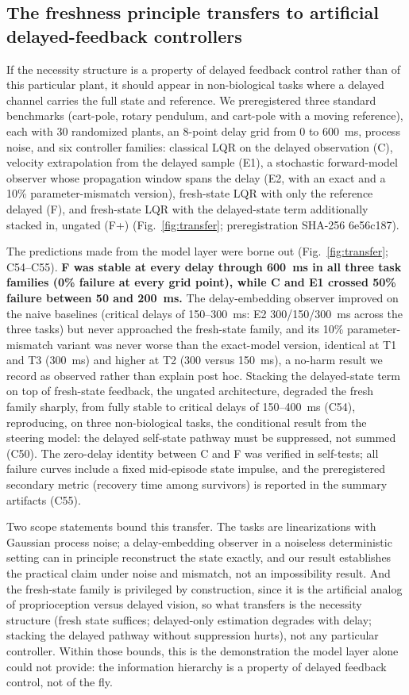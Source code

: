 \documentclass[pdflatex,sn-nature]{sn-jnl}
\begin{document}
\subsection{The freshness principle transfers to artificial delayed-feedback controllers}

If the necessity structure is a property of delayed feedback control rather than of this particular plant, it should appear in non-biological tasks where a delayed channel carries the full state and reference. We preregistered three standard benchmarks (cart-pole, rotary pendulum, and cart-pole with a moving reference), each with 30 randomized plants, an 8-point delay grid from 0 to 600~ms, process noise, and six controller families: classical LQR on the delayed observation (C), velocity extrapolation from the delayed sample (E1), a stochastic forward-model observer whose propagation window spans the delay (E2, with an exact and a 10\% parameter-mismatch version), fresh-state LQR with only the reference delayed (F), and fresh-state LQR with the delayed-state term additionally stacked in, ungated (F+) (Fig.~\ref{fig:transfer}; preregistration SHA-256 6e56c187).

The predictions made from the model layer were borne out (Fig.~\ref{fig:transfer}; C54--C55). \textbf{F was stable at every delay through 600~ms in all three task families (0\% failure at every grid point), while C and E1 crossed 50\% failure between 50 and 200~ms.} The delay-embedding observer improved on the naive baselines (critical delays of 150--300~ms: E2 300/150/300~ms across the three tasks) but never approached the fresh-state family, and its 10\% parameter-mismatch variant was never worse than the exact-model version, identical at T1 and T3 (300~ms) and higher at T2 (300 versus 150~ms), a no-harm result we record as observed rather than explain post hoc. Stacking the delayed-state term on top of fresh-state feedback, the ungated architecture, degraded the fresh family sharply, from fully stable to critical delays of 150--400~ms (C54), reproducing, on three non-biological tasks, the conditional result from the steering model: the delayed self-state pathway must be suppressed, not summed (C50). The zero-delay identity between C and F was verified in self-tests; all failure curves include a fixed mid-episode state impulse, and the preregistered secondary metric (recovery time among survivors) is reported in the summary artifacts (C55).

Two scope statements bound this transfer. The tasks are linearizations with Gaussian process noise; a delay-embedding observer in a noiseless deterministic setting can in principle reconstruct the state exactly, and our result establishes the practical claim under noise and mismatch, not an impossibility result. And the fresh-state family is privileged by construction, since it is the artificial analog of proprioception versus delayed vision, so what transfers is the necessity structure (fresh state suffices; delayed-only estimation degrades with delay; stacking the delayed pathway without suppression hurts), not any particular controller. Within those bounds, this is the demonstration the model layer alone could not provide: the information hierarchy is a property of delayed feedback control, not of the fly.
\end{document}
